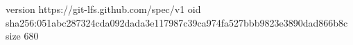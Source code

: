 version https://git-lfs.github.com/spec/v1
oid sha256:051abc287324cda092dada3e117987c39ca974fa527bbb9823e3890dad866b8c
size 680
